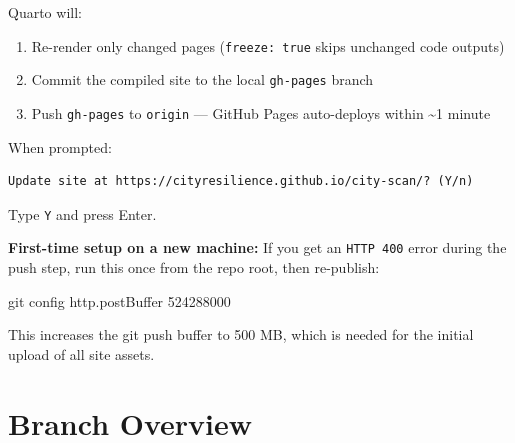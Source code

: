 \documentclass[
  letterpaper,
  DIV=11,
  numbers=noendperiod]{scrreprt}
\newenvironment{Shaded}{\begin{snugshade}}{\end{snugshade}}
\newcommand{\FunctionTok}[1]{\textcolor[rgb]{0.28,0.35,0.67}{#1}}
\newcommand{\NormalTok}[1]{\textcolor[rgb]{0.00,0.23,0.31}{#1}}
\providecommand{\tightlist}{%
  \setlength{\itemsep}{0pt}\setlength{\parskip}{0pt}}
\begin{document}
Quarto will:

\begin{enumerate}
\def\labelenumi{\arabic{enumi}.}
\tightlist
\item
  Re-render only changed pages (\texttt{freeze:\ true} skips unchanged
  code outputs)
\item
  Commit the compiled site to the local \texttt{gh-pages} branch
\item
  Push \texttt{gh-pages} to \texttt{origin} --- GitHub Pages
  auto-deploys within \textasciitilde1 minute
\end{enumerate}

When prompted:

\begin{verbatim}
Update site at https://cityresilience.github.io/city-scan/? (Y/n)
\end{verbatim}

Type \texttt{Y} and press Enter.

\begin{tcolorbox}[enhanced jigsaw, arc=.35mm, bottomrule=.15mm, bottomtitle=1mm, breakable, colback=white, colbacktitle=quarto-callout-note-color!10!white, colframe=quarto-callout-note-color-frame, coltitle=black, left=2mm, leftrule=.75mm, opacityback=0, opacitybacktitle=0.6, rightrule=.15mm, title=\textcolor{quarto-callout-note-color}{\faInfo}\hspace{0.5em}{Note}, titlerule=0mm, toprule=.15mm, toptitle=1mm]

\textbf{First-time setup on a new machine:} If you get an
\texttt{HTTP\ 400} error during the push step, run this once from the
repo root, then re-publish:

\begin{Shaded}
\begin{Highlighting}[]
\FunctionTok{git}\NormalTok{ config http.postBuffer 524288000}
\end{Highlighting}
\end{Shaded}

This increases the git push buffer to 500 MB, which is needed for the
initial upload of all site assets.

\end{tcolorbox}

\section{Branch Overview}\label{branch-overview}
\end{document}
